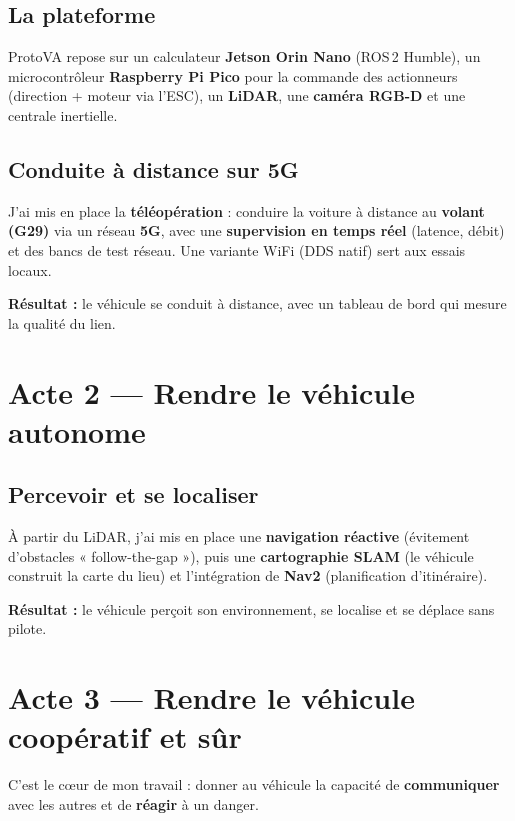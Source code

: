 \documentclass[a4paper,11pt]{article}
\begin{document}
\subsection{La plateforme}
ProtoVA repose sur un calculateur \textbf{Jetson Orin Nano} (ROS\,2 Humble), un microcontrôleur
\textbf{Raspberry Pi Pico} pour la commande des actionneurs (direction + moteur via l'ESC),
un \textbf{LiDAR}, une \textbf{caméra RGB-D} et une centrale inertielle.

\subsection{Conduite à distance sur 5G}
J'ai mis en place la \textbf{téléopération} : conduire la voiture à distance au \textbf{volant
(G29)} via un réseau \textbf{5G}, avec une \textbf{supervision en temps réel} (latence, débit)
et des bancs de test réseau. Une variante WiFi (DDS natif) sert aux essais locaux.

\begin{win}\textbf{Résultat :} le véhicule se conduit à distance, avec un tableau de bord qui
mesure la qualité du lien.\end{win}

\section{Acte 2 --- Rendre le véhicule autonome}
\subsection{Percevoir et se localiser}
À partir du LiDAR, j'ai mis en place une \textbf{navigation réactive} (évitement d'obstacles
« follow-the-gap »), puis une \textbf{cartographie SLAM} (le véhicule construit la carte du lieu)
et l'intégration de \textbf{Nav2} (planification d'itinéraire).

\begin{win}\textbf{Résultat :} le véhicule perçoit son environnement, se localise et se déplace
sans pilote.\end{win}

\section{Acte 3 --- Rendre le véhicule coopératif et sûr}
C'est le cœur de mon travail : donner au véhicule la capacité de \textbf{communiquer} avec les
autres et de \textbf{réagir} à un danger.
\end{document}
